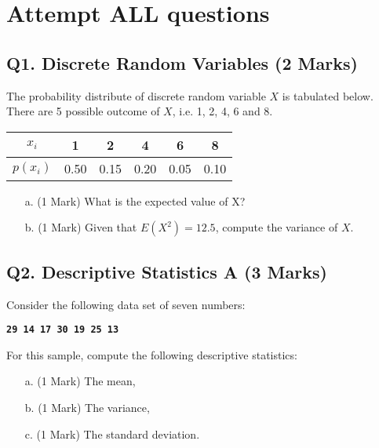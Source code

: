 \documentclass[a4paper,12pt]{article}
\begin{document}
\section*{Attempt ALL questions}

\bigskip
\subsection*{Q1. Discrete Random Variables (2 Marks)} %
The probability distribute of discrete random variable $X$ is tabulated below. There are 5 possible outcome of $X$, i.e. 1, 2, 4, 6 and 8.
\begin{center}
\begin{tabular}{|c||c|c|c|c|c|}
\hline
$x_i$  & 1 & 2 & 4 & 6 & 8  \\\hline
$p(x_i)$ & 0.50 & 0.15 & 0.20 & 0.05 & 0.10 \\
\hline
\end{tabular}
\end{center}

\begin{itemize}
\item[a.] (1 Mark) What is the expected value of X?
\item[b.] (1 Mark) Given that $E(X^2) = 12.5$, compute the variance of $X$.
\end{itemize}

\subsection*{Q2. Descriptive Statistics A (3 Marks)} %
Consider the following data set of seven numbers:

\begin{center}
\textbf{\texttt{29 14 17 30 19 25 13}}
\end{center}

\noindent For this sample, compute the following descriptive statistics:
\begin{itemize}
\item[a.] (1 Mark) The mean,
\item[b.] (1 Mark) The variance,
\item[c.] (1 Mark) The standard deviation.
\end{itemize}
\end{document}
